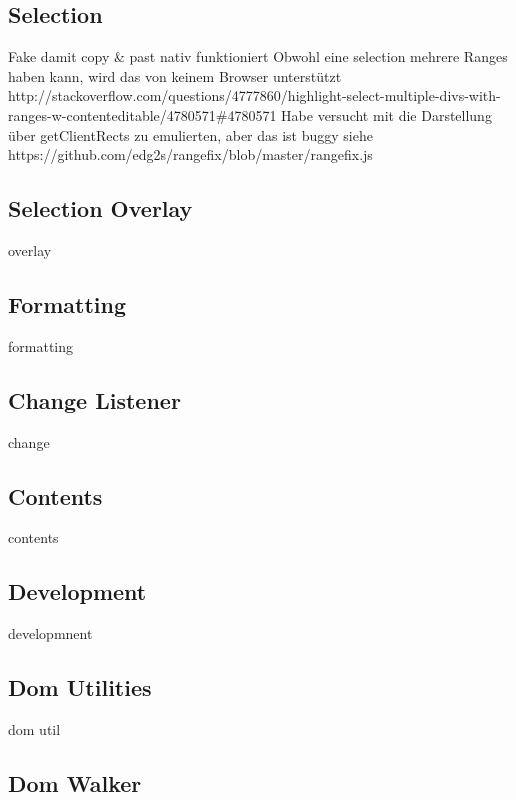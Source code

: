\subsection{Selection}
Fake damit copy \& past nativ funktioniert
Obwohl eine selection mehrere Ranges haben kann, wird das von keinem Browser unterstützt http://stackoverflow.com/questions/4777860/highlight-select-multiple-divs-with-ranges-w-contenteditable/4780571\#4780571
Habe versucht mit die Darstellung über getClientRects zu emulierten, aber das ist buggy siehe https://github.com/edg2s/rangefix/blob/master/rangefix.js


\subsection{Selection Overlay}
overlay

\subsection{Formatting}
formatting
\subsection{Change Listener}
change
\subsection{Contents}
contents
\subsection{Development}
developmnent
\subsection{Dom Utilities}
dom util
\subsection{Dom Walker}

